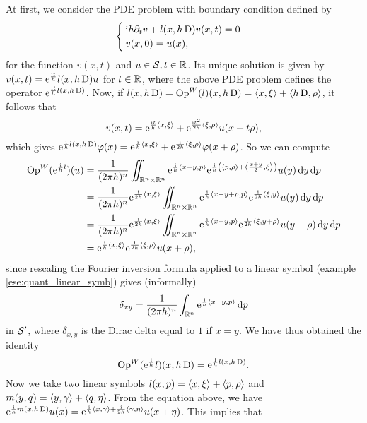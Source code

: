 \begin{prf}
At first, we consider the \textsc{PDE} problem with boundary condition defined by
\[
\begin{cases}
\mathrm{i}h\partial_{t}v+l(x,h\operatorname{D})v(x,t)=0\\
v(x,0)=u(x),
\end{cases}
\]
for the function $v(x,t)$ and $u\in\mathcal{S}, t\in\mathbb{R}$. Its unique solution is given by $v(x,t)=\mathrm{e}^{\frac{\mathrm{i} t}{h}}{l(x,h\operatorname{D})}u$ for $t\in\mathbb{R}$, where the above PDE problem defines the operator $\mathrm{e}^{\frac{\mathrm{i} t}{h}l(x,h\operatorname{D})}$. Now, if $l(x,h\operatorname{D})=\operatorname{Op}^{W}(l)(x,h\operatorname{D})=\left< x,\xi\right>+\left< h\operatorname{D},\rho\right>$, it follows that 
\[
v(x,t)=\mathrm{e}^{\frac{\mathrm{i} t}{h}\left< x,\xi\right>}+\mathrm{e}^{\frac{\mathrm{i} t^{2}}{2h}\left< \xi,\rho\right>}u(x+t\rho),
\] 
which gives $\mathrm{e}^{\frac{\mathrm{i}}{h}l(x,h\operatorname{D})}\varphi(x)=\mathrm{e}^{\frac{\mathrm{i}}{h}\left< x,\xi\right>}+\mathrm{e}^{\frac{\mathrm{i}}{2h}\left< \xi,\rho\right>}\varphi(x+\rho)$. So we can compute
\begin{align*}
\operatorname{Op}^{W}(\mathrm{e}^{\frac{\mathrm{i}}{h}l})(u)&=\frac{1}{(2\pi h)^{n}}\iint_{\mathbb{R}^{n}\times\mathbb{R}^{n}}\mathrm{e}^{\frac{\mathrm{i}}{h}\left< x-y,p\right>}\mathrm{e}^{\frac{\mathrm{i}}{h}\left(\left< p,\rho\right>+\left< \frac{x+y}{2},\xi\right>\right)}u(y)\mathop{}\!\mathrm{d} y\mathop{}\!\mathrm{d} p\\
&=\frac{1}{(2\pi h)^{n}}\mathrm{e}^{\frac{\mathrm{i}}{2h}\left< x,\xi\right>}\iint_{\mathbb{R}^{n}\times\mathbb{R}^{n}}\mathrm{e}^{\frac{\mathrm{i}}{h}\left< x-y+\rho,p\right>}\mathrm{e}^{\frac{\mathrm{i}}{2h}\left< \xi,y\right>}u(y)\mathop{}\!\mathrm{d} y\mathop{}\!\mathrm{d} p\\
&=\frac{1}{(2\pi h)^{n}}\mathrm{e}^{\frac{\mathrm{i}}{2h}\left< x,\xi\right>}\iint_{\mathbb{R}^{n}\times\mathbb{R}^{n}}\mathrm{e}^{\frac{\mathrm{i}}{h}\left< x-y,p\right>}\mathrm{e}^{\frac{\mathrm{i}}{2h}\left< \xi,y+\rho\right>}u(y+\rho)\mathop{}\!\mathrm{d} y\mathop{}\!\mathrm{d} p\\
&=\mathrm{e}^{\frac{\mathrm{i}}{h}\left< x,\xi\right>}\mathrm{e}^{\frac{\mathrm{i}}{2h}\left< \xi,\rho\right>}u(x+\rho),
\end{align*}
since rescaling the Fourier inversion formula applied to a linear symbol (example \ref{ese:quant_linear_symb}) gives (informally)
\[
\delta_{xy}=\frac{1}{(2\pi h)^{n}}\int_{\mathbb{R}^{n}}\mathrm{e}^{\frac{\mathrm{i}}{h}\left< x-y,p\right>}\mathop{}\!\mathrm{d} p
\]
in $\mathcal{S}'$, where $\delta_{x,y}$ is the Dirac delta equal to $1$ if $x=y$. We have thus obtained the identity
\[
\operatorname{Op}^{W}(\mathrm{e}^{\frac{\mathrm{i}}{h}}l)(x,h\operatorname{D})=\mathrm{e}^{\frac{\mathrm{i}}{h}l(x,h\operatorname{D})}.
\]
Now we take two linear symbols $l(x,p)=\left< x,\xi\right>+\left< p,\rho\right>$ and $m(y,q)=\left< y,\gamma\right>+\left< q,\eta\right>$. From the equation above, we have $\mathrm{e}^{\frac{\mathrm{i}}{h}m(x,h\operatorname{D})}u(x)=\mathrm{e}^{\frac{\mathrm{i}}{h}\left< x,\gamma\right>+\frac{\mathrm{i}}{2h}\left< \gamma,\eta\right>}u(x+\eta)$. This implies that 

\end{prf}
